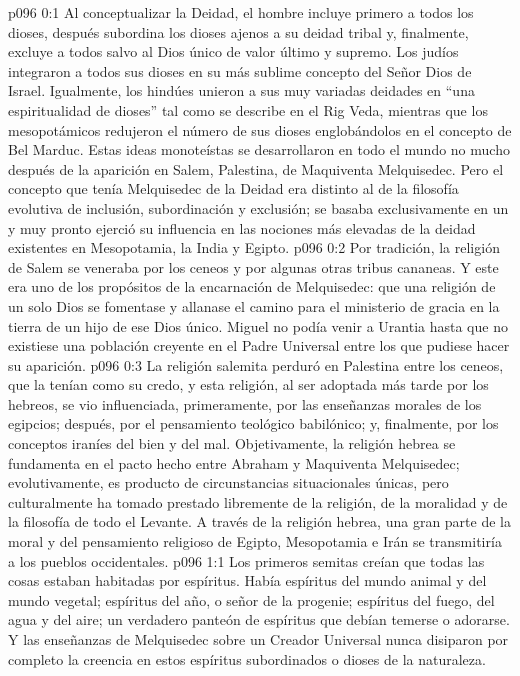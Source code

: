 \author{Melquisedec}
\vs p096 0:1 Al conceptualizar la Deidad, el hombre incluye primero a todos los dioses, después subordina los dioses ajenos a su deidad tribal y, finalmente, excluye a todos salvo al Dios único de valor último y supremo. Los judíos integraron a todos sus dioses en su más sublime concepto del Señor Dios de Israel. Igualmente, los hindúes unieron a sus muy variadas deidades en “una espiritualidad de dioses” tal como se describe en el Rig Veda, mientras que los mesopotámicos redujeron el número de sus dioses englobándolos en el concepto de Bel Marduc. Estas ideas monoteístas se desarrollaron en todo el mundo no mucho después de la aparición en Salem, Palestina, de Maquiventa Melquisedec. Pero el concepto que tenía Melquisedec de la Deidad era distinto al de la filosofía evolutiva de inclusión, subordinación y exclusión; se basaba exclusivamente en un  y muy pronto ejerció su influencia en las nociones más elevadas de la deidad existentes en Mesopotamia, la India y Egipto.
\vs p096 0:2 \pc Por tradición, la religión de Salem se veneraba por los ceneos y por algunas otras tribus cananeas. Y este era uno de los propósitos de la encarnación de Melquisedec: que una religión de un solo Dios se fomentase y allanase el camino para el ministerio de gracia en la tierra de un hijo de ese Dios único. Miguel no podía venir a Urantia hasta que no existiese una población creyente en el Padre Universal entre los que pudiese hacer su aparición.
\vs p096 0:3 La religión salemita perduró en Palestina entre los ceneos, que la tenían como su credo, y esta religión, al ser adoptada más tarde por los hebreos, se vio influenciada, primeramente, por las enseñanzas morales de los egipcios; después, por el pensamiento teológico babilónico; y, finalmente, por los conceptos iraníes del bien y del mal. Objetivamente, la religión hebrea se fundamenta en el pacto hecho entre Abraham y Maquiventa Melquisedec; evolutivamente, es producto de circunstancias situacionales únicas, pero culturalmente ha tomado prestado libremente de la religión, de la moralidad y de la filosofía de todo el Levante. A través de la religión hebrea, una gran parte de la moral y del pensamiento religioso de Egipto, Mesopotamia e Irán se transmitiría a los pueblos occidentales.
\vs p096 1:1 Los primeros semitas creían que todas las cosas estaban habitadas por espíritus. Había espíritus del mundo animal y del mundo vegetal; espíritus del año, o señor de la progenie; espíritus del fuego, del agua y del aire; un verdadero panteón de espíritus que debían temerse o adorarse. Y las enseñanzas de Melquisedec sobre un Creador Universal nunca disiparon por completo la creencia en estos espíritus subordinados o dioses de la naturaleza.
